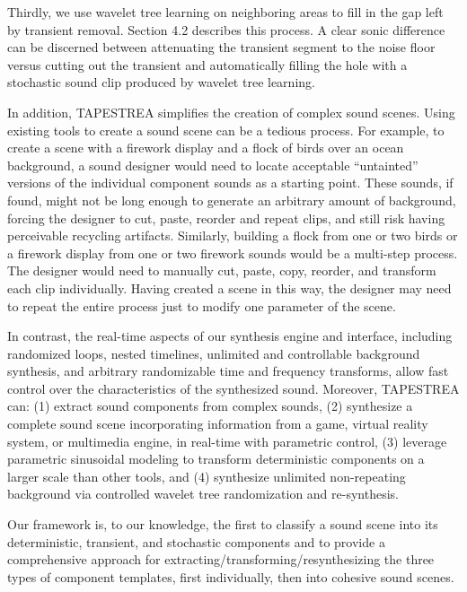 \documentclass[review]{acmsiggraph}      %
\begin{document}
Thirdly, we use wavelet tree learning on neighboring areas to fill in the gap left by 
transient removal.  Section 4.2 describes this process.  A clear sonic difference
can be discerned between attenuating the transient segment to the noise floor versus cutting 
out the transient and automatically filling the hole with a stochastic sound clip 
produced by wavelet tree learning. 

In addition, TAPESTREA simplifies the creation of complex sound scenes. Using existing 
tools to create a sound scene can be a tedious process. For example, 
to create a scene with a firework display and a flock of birds over an ocean background, a 
sound designer would need to locate acceptable ``untainted'' versions of the individual 
component sounds as a starting point. These sounds, if found, might not be long 
enough to generate an arbitrary amount of background, forcing the designer to cut, paste, 
reorder and repeat clips, and still risk having perceivable recycling artifacts. Similarly, 
building a flock from one or two birds or a firework display from one or 
two firework sounds would be a multi-step process. The designer would need to manually cut, 
paste, copy, reorder, and transform each clip individually. Having created a scene in this 
way, the designer may need to repeat the entire process just to modify one parameter of 
the scene. 

In contrast, the real-time aspects of our synthesis engine and interface, including 
randomized loops, nested timelines, unlimited and controllable background synthesis, and 
arbitrary randomizable time and frequency transforms, allow fast control over the 
characteristics of the synthesized sound. Moreover, TAPESTREA can: (1) extract sound 
components from complex sounds, (2) synthesize a complete sound scene incorporating 
information from a game, virtual reality system, or multimedia engine, in real-time 
with parametric control, (3) leverage parametric sinusoidal modeling to transform 
deterministic components on a larger scale than other tools, and (4) synthesize unlimited 
non-repeating background via controlled wavelet tree randomization and re-synthesis. 

Our framework is, to our knowledge, the first to classify a sound scene into its 
deterministic, transient, and stochastic components and to provide a comprehensive approach 
for extracting/transforming/resynthesizing the three types of component templates, first
individually, then into cohesive sound scenes.
\end{document}
